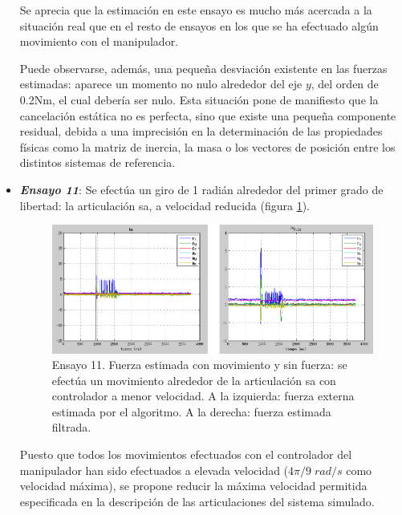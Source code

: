 \begin{itemize}
Se aprecia que la estimación en este ensayo es mucho más acercada a la situación real que en el resto de ensayos en los que se ha efectuado algún movimiento con el manipulador. \par 

Puede observarse, además, una pequeña desviación existente en las fuerzas estimadas: aparece un momento no nulo alrededor del eje $y$, del orden de 0.2Nm, el cual debería ser nulo. Esta situación pone de manifiesto que la cancelación estática no es perfecta, sino que existe una pequeña componente residual, debida a una imprecisión en la determinación de las propiedades físicas como la matriz de inercia, la masa o los vectores de posición entre los distintos sistemas de referencia. \par 

\item \textbf{\emph{Ensayo 11}}: Se efectúa un giro de 1 radián alrededor del primer grado de libertad: la articulación \acrshort{sa}, a velocidad reducida (figura \ref{fig:cmsf-SAlento}). \par 

\begin{figure}[h!]
\centering
\includegraphics[scale=0.4]{Figuras/cmsf-SAlento}
\caption[Ensayo 11. Fuerza estimada con movimiento y sin fuerza]{Ensayo 11. Fuerza estimada con movimiento y sin fuerza: se efectúa un movimiento alrededor de la articulación \acrshort{sa} con controlador a menor velocidad. A la izquierda: fuerza externa estimada por el algoritmo. A la derecha: fuerza estimada filtrada.}
\label{fig:cmsf-SAlento}
\end{figure}

Puesto que todos los movimientos efectuados con el controlador del manipulador han sido efectuados a elevada velocidad ($4\pi/9 \; rad/s$ como velocidad máxima), se propone reducir la máxima velocidad permitida especificada en la descripción de las articulaciones del sistema simulado. \par 


\end{itemize}
